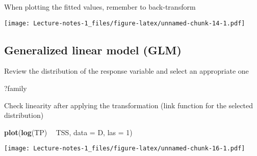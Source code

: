 \documentclass[
]{book}
\newenvironment{Shaded}{\begin{snugshade}}{\end{snugshade}}
\newcommand{\DataTypeTok}[1]{\textcolor[rgb]{0.13,0.29,0.53}{#1}}
\newcommand{\DecValTok}[1]{\textcolor[rgb]{0.00,0.00,0.81}{#1}}
\newcommand{\KeywordTok}[1]{\textcolor[rgb]{0.13,0.29,0.53}{\textbf{#1}}}
\newcommand{\NormalTok}[1]{#1}
\newcommand{\OperatorTok}[1]{\textcolor[rgb]{0.81,0.36,0.00}{\textbf{#1}}}
\newcommand{\OtherTok}[1]{\textcolor[rgb]{0.56,0.35,0.01}{#1}}
\newcommand{\StringTok}[1]{\textcolor[rgb]{0.31,0.60,0.02}{#1}}
\begin{document}
When plotting the fitted values, remember to back-transform

\begin{Shaded}
\end{Shaded}

\texttt{[image: Lecture-notes-1\_files/figure-latex/unnamed-chunk-14-1.pdf]}

\hypertarget{generalized-linear-model-glm-1}{%
\subsection{Generalized linear model (GLM)}\label{generalized-linear-model-glm-1}}

Review the distribution of the response variable and select an appropriate one

\begin{Shaded}
\begin{Highlighting}[]
\NormalTok{?family}
\end{Highlighting}
\end{Shaded}

Check linearity after applying the transformation (link function for the selected distribution)

\begin{Shaded}
\begin{Highlighting}[]
\KeywordTok{plot}\NormalTok{(}\KeywordTok{log}\NormalTok{(TP) }\OperatorTok{~}\StringTok{ }\NormalTok{TSS, }\DataTypeTok{data =}\NormalTok{ D, }\DataTypeTok{las =} \DecValTok{1}\NormalTok{)}
\end{Highlighting}
\end{Shaded}

\texttt{[image: Lecture-notes-1\_files/figure-latex/unnamed-chunk-16-1.pdf]}
\end{document}
